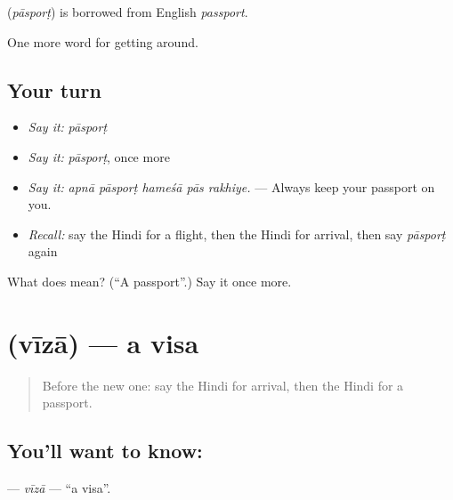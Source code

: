\begin{cousinweb}
\textbf{} (\emph{pāsporṭ}) is borrowed from English \emph{passport}.
\end{cousinweb}

\begin{grammarlens}[title={What you've built}]
One more word for getting around.
\end{grammarlens}

\subsection*{Your turn}
\begin{itemize}
\raggedright
  \item \emph{Say it:} \emph{pāsporṭ}
  \item \emph{Say it:} \emph{pāsporṭ}, once more
  \item \emph{Say it:} \emph{apnā pāsporṭ hameśā pās rakhiye.} — Always keep your passport on you.
  \item \emph{Recall:} say the Hindi for a flight, then the Hindi for arrival, then say \emph{pāsporṭ} again
\end{itemize}

\begin{tcolorbox}[breakable,colback=teal!4,colframe=teal!35!black,title={Before you move on}]
What does  mean? (\textquotedblleft{}A passport\textquotedblright{}.) Say it once more.
\end{tcolorbox}
\section[\texorpdfstring{\hi{वीज़ा} (vīzā)}{वीज़ा (vīzā)}]{ (vīzā) — a visa}

\label{lesson:HI-C410-viza}



\begin{quote}
Before the new one: say the Hindi for arrival, then the Hindi for a passport.
\end{quote}

\subsection*{You'll want to know: }
\textbf{} — \emph{vīzā} — \textquotedblleft{}a visa\textquotedblright{}.

\begin{quote}
    
\end{quote}

